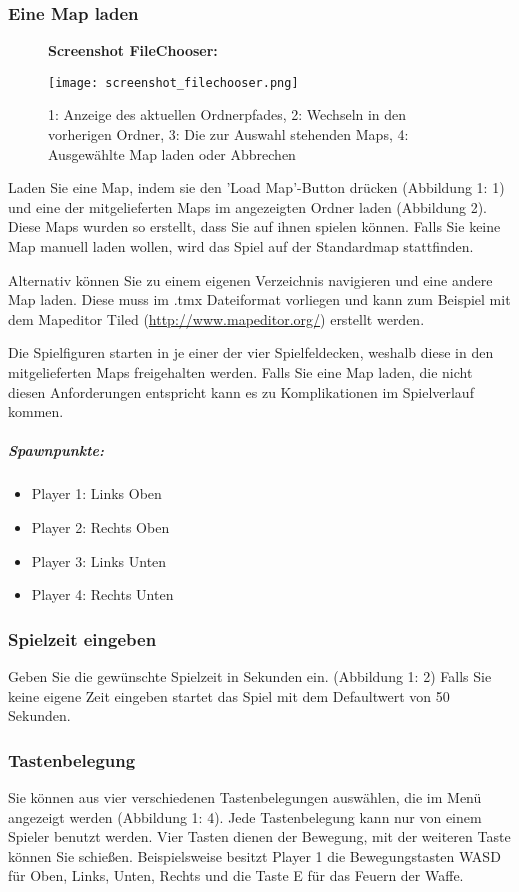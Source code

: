 \documentclass[a4paper]{article}
\begin{document}
\subsubsection{Eine Map laden}
\begin{figure}[H]
  \textbf{Screenshot FileChooser:}\par\medskip
  \centering
\texttt{[image: screenshot\_filechooser.png]}  
\caption{1: Anzeige des aktuellen Ordnerpfades, 2: Wechseln in den vorherigen Ordner, 3: Die zur Auswahl stehenden Maps, 4: Ausgewählte Map laden oder Abbrechen}
\end{figure}
 
Laden Sie eine Map, indem sie den 'Load Map'-Button drücken (Abbildung 1: 1) und eine der mitgelieferten Maps im angezeigten Ordner laden (Abbildung 2). Diese Maps wurden so erstellt, dass Sie auf ihnen spielen können. Falls Sie keine Map manuell laden wollen, wird das Spiel auf der Standardmap stattfinden. 


Alternativ können Sie zu einem eigenen Verzeichnis navigieren und eine andere Map laden. Diese muss im .tmx Dateiformat vorliegen und kann zum Beispiel mit dem Mapeditor Tiled (\url{http://www.mapeditor.org/}) erstellt werden. 

Die Spielfiguren starten in je einer der vier Spielfeldecken, weshalb diese in den mitgelieferten Maps freigehalten werden. Falls Sie eine Map laden, die nicht diesen Anforderungen entspricht kann es zu Komplikationen im Spielverlauf kommen.
\subparagraph{Spawnpunkte:}
\begin{itemize}
\item Player 1: Links Oben
\item Player 2: Rechts Oben
\item Player 3: Links Unten
\item Player 4: Rechts Unten
\end{itemize}

\subsubsection{Spielzeit eingeben}
Geben Sie die gewünschte Spielzeit in Sekunden ein. (Abbildung 1: 2) Falls Sie keine eigene Zeit eingeben startet das Spiel mit dem Defaultwert von 50 Sekunden. 

\subsubsection{Tastenbelegung}
Sie können aus vier verschiedenen Tastenbelegungen auswählen, die im Menü angezeigt werden (Abbildung 1: 4). Jede Tastenbelegung kann nur von einem Spieler benutzt werden. Vier Tasten dienen der Bewegung, mit der weiteren Taste können Sie schießen. 
Beispielsweise besitzt Player 1 die Bewegungstasten WASD für Oben, Links, Unten, Rechts und die Taste E für das Feuern der Waffe.
\end{document}
